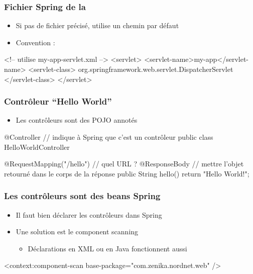 \begin{frame}[fragile]
 \frametitle{Fichier Spring de la }
 
  \begin{itemize}
   \item Si pas de fichier précisé, utilise un chemin par défaut
   \item Convention : 
  \end{itemize}
  
 \begin{xmlcode}
<!-- utilise my-app-servlet.xml -->
<servlet>
  <servlet-name>my-app</servlet-name>
  <servlet-class>
    org.springframework.web.servlet.DispatcherServlet
  </servlet-class>  
</servlet>
 \end{xmlcode}
 
\end{frame}

\begin{frame}[fragile]
 \frametitle{Contrôleur ``Hello World''}
 
  \begin{itemize}
   \item Les contrôleurs sont des POJO annotés
  \end{itemize}
  
 \begin{javacode}
@Controller // indique \`a Spring que c'est un contr\^oleur
public class HelloWorldController {

  @RequestMapping("/hello") // quel URL ?
  @ResponseBody // mettre l'objet retourn\'e dans le corps de la r\'eponse
  public String hello() {
    return "Hello World!";
  }
  
}
 \end{javacode}
 
\end{frame}

\begin{frame}[fragile]
 \frametitle{Les contrôleurs sont des beans Spring}
 
  \begin{itemize}
   \item Il faut bien déclarer les contrôleurs dans Spring
   \item Une solution est le component scanning
   \begin{itemize}
    \item Déclarations en XML ou en Java fonctionnent aussi
   \end{itemize}
  \end{itemize}
  
 \begin{xmlcode}
<context:component-scan base-package="com.zenika.nordnet.web" />
 \end{xmlcode}
 
\end{frame}


